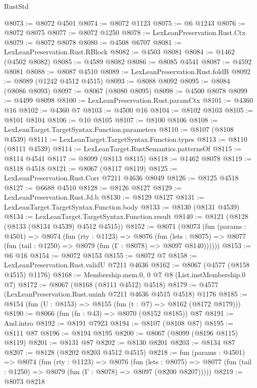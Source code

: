 \begin{lexlean}{RustStd}
\begin{coremodule}
@8073 := @8072 @4501
@8074 := @8072 @1123
@8075 := @6 @1243
@8076 := @8072 @8075
@8077 := @8072 @1250
@8078 := LexLeanPreservation.Rust.Ctx
@8079 := @8072 @8078
@8080 := @4508 @6707
@8081 := LexLeanPreservation.Rust.RBlock
@8082 := @4503 @8081
@8084 := @1462 (@4502 @8082)
@8085 := @4589 @8082
@8086 := @8085 @4541
@8087 := @4592 @8081
@8088 := @8087 @4510
@8089 := LexLeanPreservation.Rust.foldB
@8092 := @8089 (@1242 @4512 @4515)
@8093 := @8088 @8092
@8095 := @8084 (@8086 @8093)
@8097 := @8067 (@8080 @8095)
@8098 := @4500 @8078
@8099 := @4499 @8098
@8100 := LexLeanPreservation.Rust.paramCtx
@8101 := @4360 @16
@8102 := @4360 @7
@8103 := @4500 @16
@8104 := @8102 @8103
@8105 := @8101 @8104
@8106 := @10 @8105
@8107 := @8100 @8106
@8108 := LexLeanTarget.TargetSyntax.Function.parameters
@8110 := @8107 (@8108 @4539)
@8111 := LexLeanTarget.TargetSyntax.Function.types
@8113 := @8110 (@8111 @4539)
@8114 := LexLeanTarget.RustSemantics.patternsOf
@8115 := @8114 @4541
@8117 := @8099 (@8113 @8115)
@8118 := @1462 @8078
@8119 := @8118 @4518
@8121 := @8067 (@8117 @8119)
@8125 := LexLeanPreservation.Rust.Corr @7211 @4636 @8049
@8126 := @8125 @4518
@8127 := @6688 @4510
@8128 := @8126 @8127
@8129 := LexLeanPreservation.Rust.Jd.b
@8130 := @8129 @8127
@8131 := LexLeanTarget.TargetSyntax.Function.body
@8133 := @8130 (@8131 @4539)
@8134 := LexLeanTarget.TargetSyntax.Function.result
@8140 := @8121 (@8128 (@8133 (@8134 @4539) @4512 @4515))
@8152 := @8071
    (@8073
      (fun (params : @4501) =>
      @8074
        (fun (rty : @1123) =>
        @8076
          (fun (lets : @8075) =>
          @8077 (fun (tail : @1250) => @8079 (fun (Γ : @8078) => @8097 @8140))))))
@8153 := @6 @16
@8154 := @8072 @8153
@8155 := @8072 @7
@8158 := LexLeanPreservation.Rust.validU @7211 @4636
@8162 := @8067 (@4577 (@8158 @4515) @1176)
@8168 := Membership.mem.{0, 0} @7 @8 (List.instMembership.{0} @7)
@8172 := @8067 (@8168 (@8111 @4512) @4518)
@8179 := @4577 (LexLeanPreservation.Rust.uninh @7211 @4636 @4515 @4518) @1176
@8185 := @8154 (fun (U : @8153) => @8155 (fun (t : @7) => @8162 (@8172 @8179)))
@8190 := @8066 (fun (fn : @43) => @8070 (@8152 @8185)) @87
@8191 := And.intro
@8192 := @8191 @7923
@8194 := @8107 (@8108 @87)
@8195 := @8111 @87
@8196 := @8194 @8195
@8200 := @8067 (@8099 (@8196 @8115) @8119)
@8201 := @8131 @87
@8202 := @8130 @8201
@8203 := @8134 @87
@8207 := @8128 (@8202 @8203 @4512 @4515)
@8218 := fun (params : @4501) =>
  @8074
    (fun (rty : @1123) =>
    @8076
      (fun (lets : @8075) =>
      @8077 (fun (tail : @1250) => @8079 (fun (Γ : @8078) => @8097 (@8200 @8207)))))
@8219 := @8073 @8218

\end{coremodule}
\end{lexlean}
